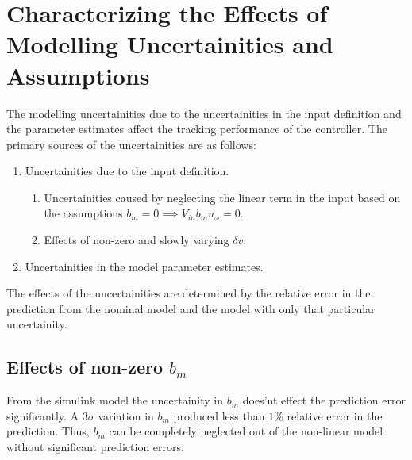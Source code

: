 \section{Characterizing the Effects of Modelling Uncertainities and Assumptions}
The modelling uncertainities due to the uncertainities in the input definition
and the parameter estimates affect the tracking performance of the controller.
The primary sources of the uncertainities are as follows:
\begin{enumerate}
    \item Uncertainities due to the input definition.
    \begin{enumerate}
        \item Uncertainities caused by neglecting the linear term in the input based on
        the assumptions $b_m = 0 \implies V_{in} b_m u_\omega = 0$.
        \item Effects of non-zero and slowly varying $\delta v$.
    \end{enumerate}

    \item Uncertainities in the model parameter estimates.
\end{enumerate}

The effects of the uncertainities are determined by the relative error in the
prediction from the nominal model and the model with only that particular uncertainity.

\subsection{Effects of non-zero $b_m$}
From the simulink model the uncertainity in $b_m$ does'nt effect the prediction
error significantly. A $3 \sigma$ variation in $b_m$ produced less than $1\%$
relative error in the prediction. Thus, $b_m$ can be completely neglected out of
the non-linear model without significant prediction errors.

